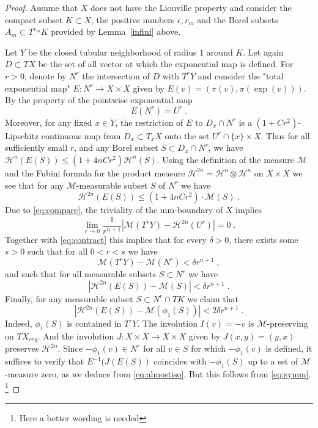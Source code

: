 \documentclass[12pt,leqno]{amsart}
\numberwithin{equation}{section}
\theoremstyle{definition}
\theoremstyle{remark}
\newcommand{\lref}[1]{Lemma~\ref{#1}}
\begin{document}
\begin{proof}
Assume that $X$ does not have the Liouville property and consider the compact subset $K \subset X$, the positive numbers $\epsilon, r_m$ and the Borel
subsets $A_m\subset T^{r_m} K$ provided by \lref{infini} above.

Let $Y$ be the closed tubular neighborhood  of radius $1$ around $K$.
Let again $D\subset TX$ be the set of all vector at which the exponential map is defined.
  For $r>0$, denote  by $N^r$ the intersection of $D$ with $T^r Y$ and consider the "total exponential map"
$E:N^r \to X\times X$ given by $E(v)= (\pi (v), \pi (\exp (v)))$.  By the property of the pointwise exponential map
\begin{equation} \label{eq:image}
E(N^r) =U^r \; .
\end{equation}
Moreover, for any  fixed $x \in Y$, the restriction of $E$ to $D_x \cap N^r$ is
a $(1+ C r^2)$-Lipschitz continuous map from $D_x\subset T_xX$ onto the set  $U^r \cap \{x \} \times X$.
Thus for all sufficiently small $r$, and any Borel subset $S\subset D_x \cap N^r$, we have
$\mathcal H^n (E(S)) \leq (1+4n C r^2) \mathcal H^n (S)$.  Using the definition of the measure $\mathcal M$ and  the Fubini formula for the product measure
$\mathcal H^{2n} =\mathcal H^n \otimes \mathcal H^n $ on $X\times X$ we see that for any $\mathcal M$-measurable subset $S$ of $N^r$
we have 
\begin{equation} \label{eq:contract}
\mathcal H^{2n} (E(S)) \leq (1+4nC r^2) \cdot \mathcal M(S)\; .
\end{equation}
Due to \eqref{eq:compare}, the triviality of the mm-boundary of $X$ implies 
$$\lim _{r\to 0} \frac 1 {r^{n+1} } |\mathcal M(T^r Y) -\mathcal H^{2n} (U^r)| =0 \;.$$
	Together with  \eqref{eq:contract} this implies that for every  $\delta >0$, there exists some $s>0$ such that for all $0<r<s$
	we have 
	\begin{equation}  \label{eq:almostall}
	\mathcal M (T^r Y)- \mathcal M (N^r) < \delta r^{n+1} \; ,
	\end{equation}
	and such that for all measurable subsets $S\subset N^r$ we have   
	\begin{equation}  \label{eq:almostiso}
	|\mathcal H^{2n} (E(S)) - \mathcal M  (S)|  < \delta r^{n+1} \;.
\end{equation}
Finally, for any measurable subset $S\subset N^r \cap TK$  we claim  that
\begin{equation} \label{eq:finally}
|\mathcal H^{2n} (E(S)) - \mathcal M (\phi _1 (S))|  <  2 \delta r^{n+1} \; .
\end{equation}
Indeed, $\phi _1 (S)$ is contained in $T^rY$. The involution  $I(v)=-v$ is $\mathcal M$-preserving on $TX_{reg}$.  And the involution
 $J:X\times X\to X\times X$ given by $J(x,y)=(y,x)$ preserves $\mathcal H^{2n}$. 
 Since $-\phi _1 (v) \in N^r$ for all $v\in S$ for which $-\phi _1 (v)$ is defined, 
it suffices to verify that $E^{-1} (J (E(S)) $   coincides with $-\phi _1 (S)$ up to a set of $\mathcal M$-measure zero, as we deduce from \eqref{eq:almostiso}.
But this follows from \eqref{eq:symm}. \footnote{Here a better wording  is needed} 


\end{proof}
\end{document}
